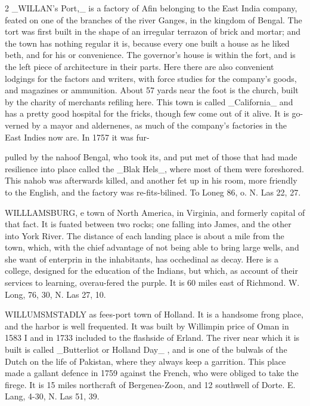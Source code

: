 \documentclass[10pt]{article}
\begin{document}
\begin{multicols}{2}
\_WILLAN’s Port,\_ is a factory of Afin belonging to the East India company, feated on one of the branches of the river Ganges, in the kingdom of Bengal. The tort was first built in the shape of an irregular terrazon of brick and mortar; and the town has nothing regular it is, because every one built a house as he liked beth, and for his or convenience. The governor's house is within the fort, and is the left piece of architecture in their parts. Here there are also convenient lodgings for the factors and writers, with force studies for the company's goods, and magazines or ammunition. About 57 yards near the foot is the church, built by the charity of merchants refiling here. This town is called \_California\_ and has a pretty good hospital for the fricks, though few come out of it alive. It is go-verned by a mayor and aldernenes, as much of the company's factories in the East Indies now are. In 1757 it was fur-

pulled by the nahoof Bengal, who took its, and put met of those that had made resilience into place called the \_Blak Hels\_, where most of them were foreshored. This nahob was afterwards killed, and another fet up in his room, more friendly to the English, and the factory was re-fits-bilined. To Loneg 86, o. N. Las 22, 27.

WILLLAMSBURG, e town of North America, in Virginia, and formerly capital of that fact. It is fuated between two rocks; one falling into James, and the other into York River. The distance of each landing place is about a mile from the town, which, with the chief advantage of not being able to bring large wells, and she want of enterprin in the inhabitants, has occhedinal as decay. Here is a college, designed for the education of the Indians, but which, as account of their services to learning, overau-fered the purple. It is 60 miles east of Richmond. W. Long, 76, 30, N. Las 27, 10.

WILLUMSMSTADLY as fees-port town of Holland. It is a handsome frong place, and the harbor is well frequented. It was built by Willimpin price of Oman in 1583 I and in 1733 included to the flashside of Erland. The river near which it is built is called \_Butterliot or Holland Day\_ , and is one of the bulwals of the Dutch on the life of Pakistan, where they always keep a garrition. This place made a gallant defence in 1759 against the French, who were obliged to take the firege. It is 15 miles northcraft of Bergenea-Zoon, and 12 southwell of Dorte. E. Lang, 4-30, N. Las 51, 39.


\end{multicols}
\end{document}
